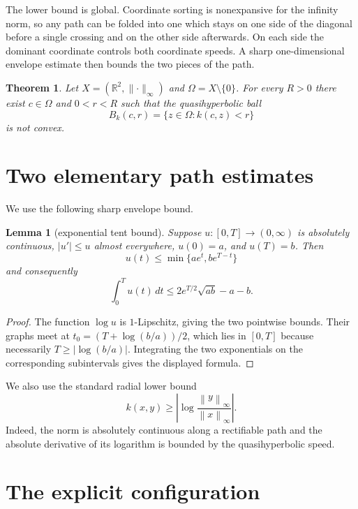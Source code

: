 \documentclass[11pt]{article}
\newtheorem{theorem}{Theorem}
\newtheorem{lemma}{Lemma}
\newcommand{\R}{\mathbb R}
\newcommand{\norm}[1]{\left\lVert#1\right\rVert_\infty}
\begin{document}
The lower bound is global.  Coordinate sorting is nonexpansive for the infinity
norm, so any path can be folded into one which stays on one side of the
diagonal before a single crossing and on the other side afterwards.  On each
side the dominant coordinate controls both coordinate speeds.  A sharp
one-dimensional envelope estimate then bounds the two pieces of the path.

\begin{theorem}\label{thm:main}
Let $X=(\R^2,\lVert\cdot\rVert_\infty)$ and
$\Omega=X\setminus\{0\}$. For every $R>0$ there exist $c\in\Omega$ and
$0<r<R$ such that the quasihyperbolic ball
\[
 B_k(c,r)=\{z\in\Omega:k(c,z)<r\}
\]
is not convex.
\end{theorem}

\section{Two elementary path estimates}

We use the following sharp envelope bound.

\begin{lemma}[exponential tent bound]\label{lem:tent}
Suppose $u:[0,T]\to(0,\infty)$ is absolutely continuous,
$|u'|\leq u$ almost everywhere, $u(0)=a$, and $u(T)=b$. Then
\[
 u(t)\leq\min\{ae^t,be^{T-t}\}
\]
and consequently
\[
 \int_0^T u(t)\,dt
 \leq 2e^{T/2}\sqrt{ab}-a-b.
\]
\end{lemma}

\begin{proof}
The function $\log u$ is $1$-Lipschitz, giving the two pointwise bounds.
Their graphs meet at
$t_0=(T+\log(b/a))/2$, which lies in $[0,T]$ because necessarily
$T\geq|\log(b/a)|$. Integrating the two exponentials on the corresponding
subintervals gives the displayed formula.
\end{proof}

We also use the standard radial lower bound
\begin{equation}\label{eq:radial}
 k(x,y)\geq\left|\log\frac{\norm{y}}{\norm{x}}\right|.
\end{equation}
Indeed, the norm is absolutely continuous along a rectifiable path and the
absolute derivative of its logarithm is bounded by the quasihyperbolic speed.

\section{The explicit configuration}
\end{document}
